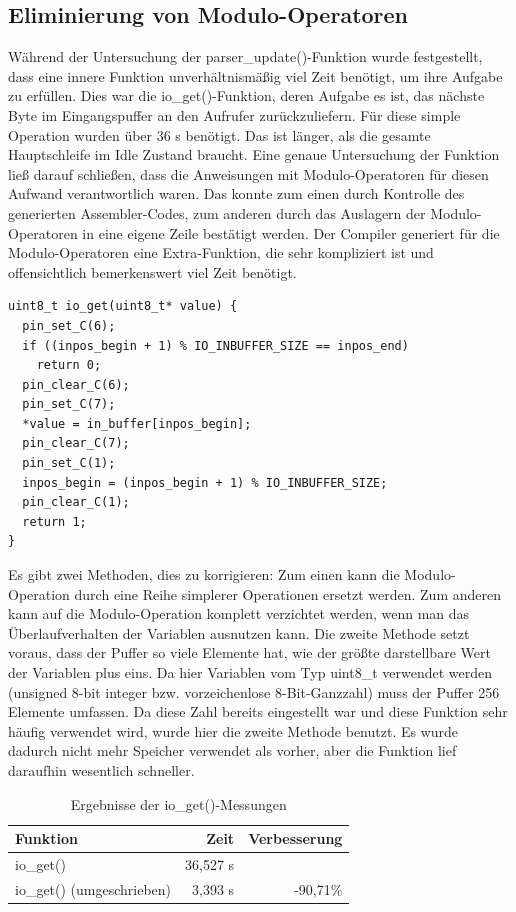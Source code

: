 \subsection{Eliminierung von Modulo-Operatoren}
Während der Untersuchung der parser\_\-update()-Funktion wurde festgestellt, dass eine innere Funktion unverhältnismäßig
viel Zeit benötigt, um ihre Aufgabe zu erfüllen. Dies war die io\_\-get()-Funktion, deren Aufgabe es ist, das nächste Byte
im Eingangspuffer an den Aufrufer zurückzuliefern. Für diese simple Operation wurden über 36 \textmu{}s benötigt.
Das ist länger, als die gesamte Hauptschleife im Idle Zustand braucht.
Eine genaue Untersuchung der Funktion ließ darauf schließen, dass die Anweisungen
mit Modulo-Operatoren für diesen Aufwand verantwortlich waren. Das konnte zum einen durch Kontrolle des generierten
Assembler-Codes, zum anderen durch das Auslagern der Modulo-Operatoren in eine eigene Zeile bestätigt werden. Der Compiler generiert
für die Modulo-Operatoren eine Extra-Funktion, die sehr kompliziert ist und offensichtlich bemerkenswert viel Zeit benötigt.\\
\begin{verbatim}
uint8_t io_get(uint8_t* value) {
  pin_set_C(6);
  if ((inpos_begin + 1) % IO_INBUFFER_SIZE == inpos_end)
    return 0;
  pin_clear_C(6);
  pin_set_C(7);
  *value = in_buffer[inpos_begin];
  pin_clear_C(7);
  pin_set_C(1);
  inpos_begin = (inpos_begin + 1) % IO_INBUFFER_SIZE;
  pin_clear_C(1);
  return 1;
}
\end{verbatim}
Es gibt zwei Methoden, dies zu korrigieren: Zum einen kann die Modulo-Operation durch eine Reihe simplerer Operationen ersetzt werden.
Zum anderen kann auf die Modulo-Operation komplett verzichtet werden, wenn man das Überlaufverhalten der Variablen ausnutzen kann.
Die zweite Methode setzt voraus, dass der Puffer so viele Elemente hat, wie der größte darstellbare Wert der Variablen plus eins.
Da hier Variablen vom Typ uint8\_t verwendet werden (unsigned 8-bit integer bzw. vorzeichenlose 8-Bit-Ganzzahl) muss der Puffer 256
Elemente umfassen. Da diese Zahl bereits eingestellt war und diese Funktion sehr häufig verwendet wird, wurde hier die zweite Methode
benutzt. Es wurde dadurch nicht mehr Speicher verwendet als vorher, aber die Funktion lief daraufhin wesentlich schneller.
\begin{table}[htb]
\begin{center}
	\begin{tabular}{|l||r|r|}
		\hline
		\textbf{Funktion} & \textbf{Zeit} & \textbf{Verbesserung} \\ \hline \hline
		io\_get() & 36,527 \textmu{}s & \\ \hline
		io\_get() (umgeschrieben) & 3,393 \textmu{}s & -90,71\% \\ \hline
	\end{tabular}
	\caption{\label{io_get} Ergebnisse der io\_get()-Messungen}
\end{center}
\end{table}

